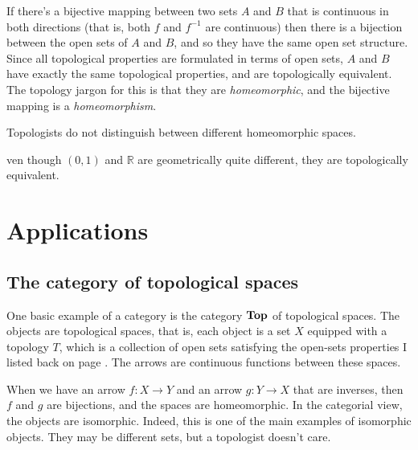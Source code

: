 \documentclass{article}
\def\R{{\mathbb R}}
\def\cat#1{{\bf #1}}
\newcounter{exercisecounter}\setcounter{exercisecounter}{1}
\def\Exercise.#1\par{{\item\small {\bf Exercise \number\theexercisecounter}.#1\addtocounter{exercisecounter}{1}}}
\begin{document}
If there's a bijective mapping between two sets $A$ and $B$ that is
continuous in both directions (that is, both $f$ and $f^{-1}$ are
continuous) then there is a bijection between the open sets of $A$ and
$B$, and so they have the same open set structure.  Since all
topological properties are formulated in terms of open sets, $A$ and
$B$ have exactly the same topological properties, and are
topologically equivalent.  The topology jargon for this is that they
are {\em homeomorphic\/}, and the bijective mapping is a {\em 
homeomorphism\/}. 

Topologists do not distinguish between different homeomorphic
spaces.

\begin{itemize}
\Exercise.  Even though $(0,1)$ and $\R$ are geometrically quite
different, they are topologically equivalent.

\end{itemize}

\section*{Applications}

\subsection*{The category of topological spaces}

One basic example of a category is the category $\cat{Top}$ of
topological spaces.  The objects are topological spaces, that is, each
object is a set $X$ equipped with a topology $T$, which is a
collection of open sets satisfying the open-sets properties I listed
back on page \pageref{topology-def}.  The arrows are continuous
functions between these spaces.

When we have an arrow $f : X\to Y$ and an arrow $g : Y\to X$ that are
inverses, then $f$ and $g$ are bijections, and the spaces are
homeomorphic.  In the categorial view, the objects are isomorphic.
Indeed, this is one of the main examples of isomorphic objects.  They
may be different sets, but a topologist doesn't care.  

\end{document}
